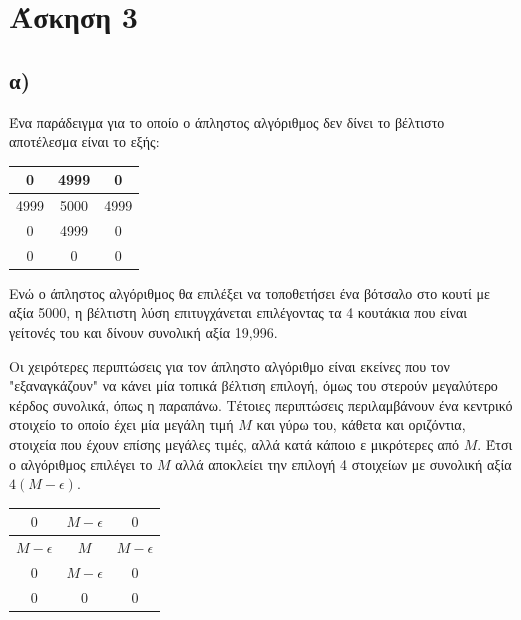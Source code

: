 \documentclass[11pt,a4paper]{book}
\begin{document}
\section*{Άσκηση 3}
\subsection*{α)}
Ένα παράδειγμα για το οποίο ο άπληστος αλγόριθμος δεν δίνει το βέλτιστο αποτέλεσμα είναι το εξής:

\vspace{3mm}
\begin{doublespace}
\begin{tabular}{|c|c|c|}
	\hline
	0    & 4999 & 0    \\ \hline
	4999 & 5000 & 4999 \\ \hline
	0    & 4999 & 0    \\ \hline
	0    &    0 & 0    \\ \hline
\end{tabular}
\end{doublespace}
\vspace{3mm}

Ενώ ο άπληστος αλγόριθμος θα επιλέξει να τοποθετήσει ένα βότσαλο
στο κουτί με αξία 5000, η βέλτιστη λύση επιτυγχάνεται επιλέγοντας
τα 4 κουτάκια που είναι γείτονές του και δίνουν συνολική αξία 19,996.

Οι χειρότερες περιπτώσεις για τον άπληστο αλγόριθμο είναι εκείνες που τον "εξαναγκάζουν" να κάνει μία τοπικά βέλτιση επιλογή, όμως του στερούν μεγαλύτερο κέρδος συνολικά, όπως η παραπάνω. Τέτοιες περιπτώσεις περιλαμβάνουν ένα κεντρικό στοιχείο το οποίο έχει μία μεγάλη τιμή $M$ και γύρω του, κάθετα και οριζόντια, στοιχεία που έχουν επίσης μεγάλες τιμές, αλλά κατά κάποιο ε μικρότερες από $M$. Έτσι ο αλγόριθμος επιλέγει το $M$ αλλά αποκλείει την επιλογή 4 στοιχείων με συνολική αξία $4(M - \epsilon)$.

\vspace{3mm}
\begin{doublespace}
\begin{tabular}{|c|c|c|}
	\hline
	$0$            & $M - \epsilon$ & $0$            \\ \hline
	$M - \epsilon$ & $M$            & $M - \epsilon$ \\ \hline
	$0$            & $M - \epsilon$ & $0$            \\ \hline
	$0$            & $0$            & $0$            \\ \hline
\end{tabular}
\end{doublespace}
\vspace{3mm}
\end{document}
